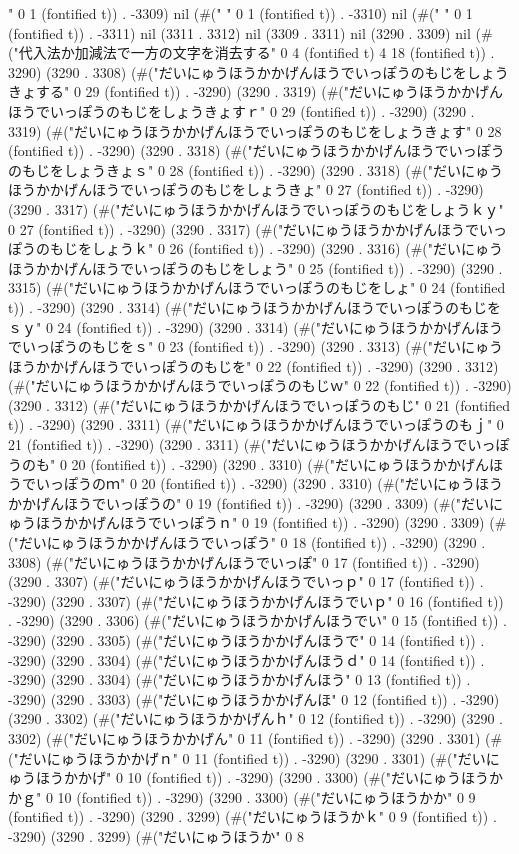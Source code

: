 " 0 1 (fontified t)) . -3309) nil (#("	" 0 1 (fontified t)) . -3310) nil (#(" " 0 1 (fontified t)) . -3311) nil (3311 . 3312) nil (3309 . 3311) nil (3290 . 3309) nil (#("代入法か加減法で一方の文字を消去する" 0 4 (fontified t) 4 18 (fontified t)) . 3290) (3290 . 3308) (#("だいにゅうほうかかげんほうでいっぽうのもじをしょうきょする" 0 29 (fontified t)) . -3290) (3290 . 3319) (#("だいにゅうほうかかげんほうでいっぽうのもじをしょうきょすｒ" 0 29 (fontified t)) . -3290) (3290 . 3319) (#("だいにゅうほうかかげんほうでいっぽうのもじをしょうきょす" 0 28 (fontified t)) . -3290) (3290 . 3318) (#("だいにゅうほうかかげんほうでいっぽうのもじをしょうきょｓ" 0 28 (fontified t)) . -3290) (3290 . 3318) (#("だいにゅうほうかかげんほうでいっぽうのもじをしょうきょ" 0 27 (fontified t)) . -3290) (3290 . 3317) (#("だいにゅうほうかかげんほうでいっぽうのもじをしょうｋｙ" 0 27 (fontified t)) . -3290) (3290 . 3317) (#("だいにゅうほうかかげんほうでいっぽうのもじをしょうｋ" 0 26 (fontified t)) . -3290) (3290 . 3316) (#("だいにゅうほうかかげんほうでいっぽうのもじをしょう" 0 25 (fontified t)) . -3290) (3290 . 3315) (#("だいにゅうほうかかげんほうでいっぽうのもじをしょ" 0 24 (fontified t)) . -3290) (3290 . 3314) (#("だいにゅうほうかかげんほうでいっぽうのもじをｓｙ" 0 24 (fontified t)) . -3290) (3290 . 3314) (#("だいにゅうほうかかげんほうでいっぽうのもじをｓ" 0 23 (fontified t)) . -3290) (3290 . 3313) (#("だいにゅうほうかかげんほうでいっぽうのもじを" 0 22 (fontified t)) . -3290) (3290 . 3312) (#("だいにゅうほうかかげんほうでいっぽうのもじｗ" 0 22 (fontified t)) . -3290) (3290 . 3312) (#("だいにゅうほうかかげんほうでいっぽうのもじ" 0 21 (fontified t)) . -3290) (3290 . 3311) (#("だいにゅうほうかかげんほうでいっぽうのもｊ" 0 21 (fontified t)) . -3290) (3290 . 3311) (#("だいにゅうほうかかげんほうでいっぽうのも" 0 20 (fontified t)) . -3290) (3290 . 3310) (#("だいにゅうほうかかげんほうでいっぽうのｍ" 0 20 (fontified t)) . -3290) (3290 . 3310) (#("だいにゅうほうかかげんほうでいっぽうの" 0 19 (fontified t)) . -3290) (3290 . 3309) (#("だいにゅうほうかかげんほうでいっぽうｎ" 0 19 (fontified t)) . -3290) (3290 . 3309) (#("だいにゅうほうかかげんほうでいっぽう" 0 18 (fontified t)) . -3290) (3290 . 3308) (#("だいにゅうほうかかげんほうでいっぽ" 0 17 (fontified t)) . -3290) (3290 . 3307) (#("だいにゅうほうかかげんほうでいっｐ" 0 17 (fontified t)) . -3290) (3290 . 3307) (#("だいにゅうほうかかげんほうでいｐ" 0 16 (fontified t)) . -3290) (3290 . 3306) (#("だいにゅうほうかかげんほうでい" 0 15 (fontified t)) . -3290) (3290 . 3305) (#("だいにゅうほうかかげんほうで" 0 14 (fontified t)) . -3290) (3290 . 3304) (#("だいにゅうほうかかげんほうｄ" 0 14 (fontified t)) . -3290) (3290 . 3304) (#("だいにゅうほうかかげんほう" 0 13 (fontified t)) . -3290) (3290 . 3303) (#("だいにゅうほうかかげんほ" 0 12 (fontified t)) . -3290) (3290 . 3302) (#("だいにゅうほうかかげんｈ" 0 12 (fontified t)) . -3290) (3290 . 3302) (#("だいにゅうほうかかげん" 0 11 (fontified t)) . -3290) (3290 . 3301) (#("だいにゅうほうかかげｎ" 0 11 (fontified t)) . -3290) (3290 . 3301) (#("だいにゅうほうかかげ" 0 10 (fontified t)) . -3290) (3290 . 3300) (#("だいにゅうほうかかｇ" 0 10 (fontified t)) . -3290) (3290 . 3300) (#("だいにゅうほうかか" 0 9 (fontified t)) . -3290) (3290 . 3299) (#("だいにゅうほうかｋ" 0 9 (fontified t)) . -3290) (3290 . 3299) (#("だいにゅうほうか" 0 8 